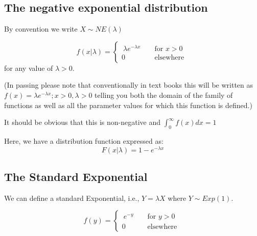 \documentclass[12pt]{extbook}
\begin{document}
\subsection{The negative exponential distribution}

{\color{green} By convention we write $X \sim NE(\lambda)$}

\begin{displaymath}
f(x|\lambda) = \left\{ \begin{array}{rrr} \  \lambda e^{-\lambda x} & & \mbox{ for } x>0 \\ 0 & & \mbox{ elsewhere } \end{array} \right.
\end{displaymath}
for any value of $\lambda>0$.

(In passing please note that conventionally in text books this will be written as $f(x)=\lambda e^{-\lambda x}; x>0, \lambda>0$ telling you both the domain of the family of functions as well as all the parameter values for which this function is defined.)

It should be obvious that this is non-negative and $\int_0^{\infty}f(x)dx=1$

Here, we have a distribution function expressed as:
\begin{displaymath}
F(x|\lambda) = 1-e^{-\lambda x}
\end{displaymath}



\subsection{The Standard Exponential}

We can define a standard Exponential, i.e., $Y=\lambda X$ where $Y \sim Exp(1)$.

\begin{displaymath}
f(y) = \left\{ \begin{array}{rrr} \   e^{- y} & & \mbox{ for } y>0 \\ 0  & & \mbox{ elsewhere } \end{array} \right.
\end{displaymath}
\end{document}
